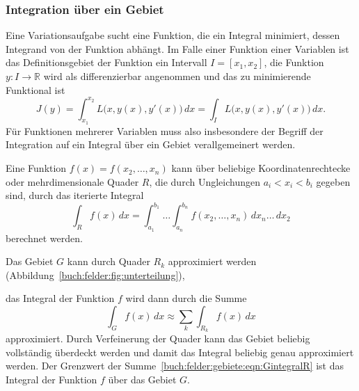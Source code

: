 %
%
\subsubsection{Integration über ein Gebiet}
Eine Variationsaufgabe sucht eine Funktion, die ein Integral minimiert,
dessen Integrand von der Funktion abhängt.
Im Falle einer Funktion einer Variablen ist das Definitionsgebiet der
Funktion ein Intervall $I=[x_1,x_2]$, die Funktion $y\colon I\to\mathbb{R}$
wird als differenzierbar angenommen und das zu minimierende Funktional
ist
\[
J(y)
=
\int_{x_1}^{x_2} L\bigl(x,y(x),y'(x)\bigr)\,dx
=
\int_I L\bigl(x,y(x),y'(x)\bigr)\,dx.
\]
Für Funktionen mehrerer Variablen muss also insbesondere der Begriff
der Integration auf ein Integral über ein Gebiet verallgemeinert werden.

Eine Funktion $f(x) = f(x_2,\dots,x_n)$ kann über beliebige
Koordinatenrechtecke oder mehrdimensionale Quader $R$,
die durch Ungleichungen $a_i< x_i<b_i$ gegeben sind, durch das iterierte
Integral
\[
\int_R f(x)
\,dx
=
\int_{a_1}^{b_1}
\dots
\int_{a_n}^{b_n}
f(x_2,\dots,x_n)
\,dx_n
\dots
\,dx_2
\]
berechnet werden.

Das Gebiet $G$ kann durch Quader $R_k$ approximiert werden
(Abbildung~\ref{buch:felder:fig:unterteilung}),

das Integral der Funktion $f$ wird dann durch die Summe
\begin{equation}
\int_G f(x)\,dx
\approx
\sum_k
\int_{R_k} f(x)\,dx
\label{buch:felder:gebiete:eqn:GintegralR}
\end{equation}
approximiert.
Durch Verfeinerung der Quader kann das Gebiet beliebig vollständig überdeckt
werden und damit das Integral beliebig genau approximiert werden.
Der Grenzwert der Summe~\eqref{buch:felder:gebiete:eqn:GintegralR}
ist das Integral der Funktion $f$ über das Gebiet $G$.

%
%
